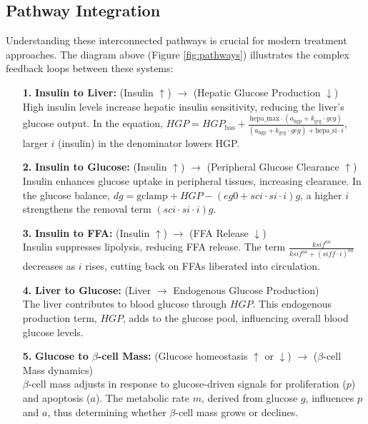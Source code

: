 \subsection{Pathway Integration}
Understanding these interconnected pathways is crucial for modern treatment approaches. The diagram above (Figure \ref{fig:pathways}) illustrates the complex feedback loops between these systems:

\begin{itemize}

    \item[\textbf{1.}] \textbf{Insulin to Liver:} (Insulin $\uparrow$) $\rightarrow$ (Hepatic Glucose Production $\downarrow$) \\
    High insulin levels increase hepatic insulin sensitivity, reducing the liver's glucose output. In the equation, $HGP = HGP_\text{bas} + \frac{\text{hepa\_max} \cdot (a_\text{hgp} + k_\text{gcg} \cdot gcg)}{(a_\text{hgp} + k_\text{gcg} \cdot gcg) + \text{hepa\_si} \cdot i}$, larger $i$ (insulin) in the denominator lowers HGP.
    
    \item[\textbf{2.}] \textbf{Insulin to Glucose:} (Insulin $\uparrow$) $\rightarrow$ (Peripheral Glucose Clearance $\uparrow$) \\
    Insulin enhances glucose uptake in peripheral tissues, increasing clearance. In the glucose balance, $dg = \text{gclamp} + HGP - (eg0 + sci \cdot si \cdot i)g$, a higher $i$ strengthens the removal term $(sci \cdot si \cdot i)g$.
    
    \item[\textbf{3.}] \textbf{Insulin to FFA:} (Insulin $\uparrow$) $\rightarrow$ (FFA Release $\downarrow$) \\
    Insulin suppresses lipolysis, reducing FFA release. The term $\frac{ksif^{aa}}{ksif^{aa}+(siff \cdot i)^{aa}}$ decreases as $i$ rises, cutting back on FFAs liberated into circulation.
    
    \item[\textbf{4.}] \textbf{Liver to Glucose:} (Liver $\rightarrow$ Endogenous Glucose Production) \\
    The liver contributes to blood glucose through $HGP$. This endogenous production term, $HGP$, adds to the glucose pool, influencing overall blood glucose levels.
    
    \item[\textbf{5.}] \textbf{Glucose to $\beta$-cell Mass:} (Glucose homeostasis $\uparrow$ or $\downarrow$) $\rightarrow$ ($\beta$-cell Mass dynamics) \\
    $\beta$-cell mass adjusts in response to glucose-driven signals for proliferation ($p$) and apoptosis ($a$). The metabolic rate $m$, derived from glucose $g$, influences $p$ and $a$, thus determining whether $\beta$-cell mass grows or declines.
    

\end{itemize}
